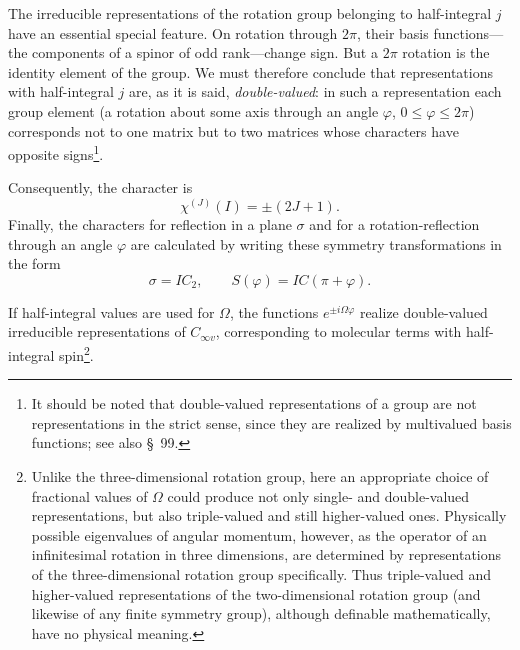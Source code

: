 The irreducible representations of the rotation group belonging to half-integral $j$ have an essential special feature. On rotation through $2\pi$, their basis functions---the components of a spinor of odd rank---change sign. But a $2\pi$ rotation is the identity element of the group. We must therefore conclude that representations with half-integral $j$ are, as it is said, \emph{double-valued}: in such a representation each group element (a rotation about some axis through an angle $\varphi$, $0\leqslant\varphi\leqslant2\pi$) corresponds not to one matrix but to two matrices whose characters have opposite signs\footnote{It should be noted that double-valued representations of a group are not representations in the strict sense, since they are realized by multivalued basis functions; see also §~99.}.





Consequently, the character is
\begin{equation}
 \chi^{(J)}(I)=\pm(2J+1).
 \tag{98.4}
\end{equation}
Finally, the characters for reflection in a plane $\sigma$ and for a rotation-reflection through an angle $\varphi$ are calculated by writing these symmetry transformations in the form
\[
 \sigma=IC_2,\qquad S(\varphi)=IC(\pi+\varphi).
\]



If half-integral values are used for $\Omega$, the functions $e^{\pm i\Omega\varphi}$ realize double-valued irreducible representations of $C_{\infty v}$, corresponding to molecular terms with half-integral spin\footnote{Unlike the three-dimensional rotation group, here an appropriate choice of fractional values of $\Omega$ could produce not only single- and double-valued representations, but also triple-valued and still higher-valued ones. Physically possible eigenvalues of angular momentum, however, as the operator of an infinitesimal rotation in three dimensions, are determined by representations of the three-dimensional rotation group specifically. Thus triple-valued and higher-valued representations of the two-dimensional rotation group (and likewise of any finite symmetry group), although definable mathematically, have no physical meaning.}.
